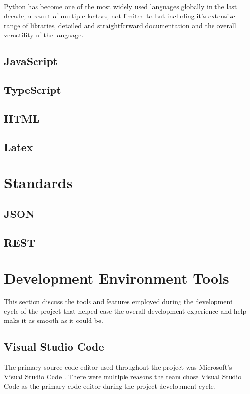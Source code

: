 \paragraph{}
Python has become one of the most widely used languages globally in the last decade, a result of multiple factors, not limited to but including it's extensive range of libraries, detailed and straightforward documentation \cite{PYTHON} and the overall versatility of the language.

\paragraph{}

\subsection{JavaScript}
\subsection{TypeScript}
\subsection{HTML}
\subsection{Latex}

\section{Standards}
\subsection{JSON}
\subsection{REST}

\section{Development Environment Tools}
This section discuss the tools and features employed during the development cycle of the project that helped ease the overall development experience and help make it as smooth as it could be.

\subsection{Visual Studio Code}
The primary source-code editor used throughout the project was Microsoft's Visual Studio Code \cite{VS_CODE}. There were multiple reasons the team chose Visual Studio Code as the primary code editor during the project development cycle.

